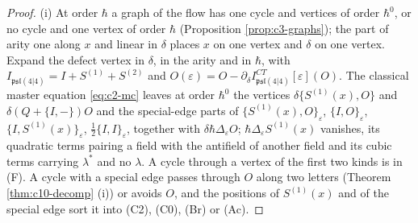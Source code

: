 \begin{proof}
(i) At order $\hbar$ a graph of the flow has one cycle and vertices of order $\hbar^0$, or no cycle and one vertex of order $\hbar$ (Proposition \ref{prop:c3-graphs}); the part of arity one along $x$ and linear in $\delta$ places $x$ on one vertex and $\delta$ on one vertex. Expand the defect vertex in $\delta$, in the arity and in $\hbar$, with $I_{\mathfrak{psl}(4|4)}=I+S^{(1)}+S^{(2)}$ and $O(\varepsilon)=O-\partial_\delta I^{CT}_{\mathfrak{psl}(4|4)}[\varepsilon](O)$. The classical master equation \eqref{eq:c2-mc} leaves at order $\hbar^0$ the vertices $\delta\{S^{(1)}(x),O\}$ and $\delta(Q+\{I,-\})O$ and the special-edge parts of $\{S^{(1)}(x),O\}_\varepsilon$, $\{I,O\}_\varepsilon$, $\{I,S^{(1)}(x)\}_\varepsilon$, $\tfrac12\{I,I\}_\varepsilon$, together with $\delta\hbar\Delta_\varepsilon O$; $\hbar\Delta_\varepsilon S^{(1)}(x)$ vanishes, its quadratic terms pairing a field with the antifield of another field and its cubic terms carrying $\lambda^*$ and no $\lambda$. A cycle through a vertex of the first two kinds is in (F). A cycle with a special edge passes through $O$ along two letters (Theorem \ref{thm:c10-decomp} (i)) or avoids $O$, and the positions of $S^{(1)}(x)$ and of the special edge sort it into (C2), (C0), (Br) or (Ac).


\end{proof}
